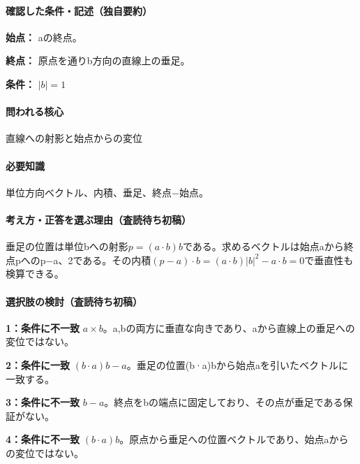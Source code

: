 \paragraph{確認した条件・記述（独自要約）}\mbox{}\par

\noindent\textbf{始点：} aの終点。\par

\noindent\textbf{終点：} 原点を通りb方向の直線上の垂足。\par

\noindent\textbf{条件：} \(|b|=1\)\par

\paragraph{問われる核心} 直線への射影と始点からの変位

\paragraph{必要知識} 単位方向ベクトル、内積、垂足、終点−始点。

\paragraph{考え方・正答を選ぶ理由（査読待ち初稿）} 垂足の位置は単位bへの射影\(p=(a\cdot b)b\)である。求めるベクトルは始点aから終点pへのp−a、2である。その内積\((p-a)\cdot b=(a\cdot b)|b|^2-a\cdot b=0\)で垂直性も検算できる。

\paragraph{選択肢の検討（査読待ち初稿）}\mbox{}\par

\noindent\textbf{1：条件に不一致} \(a\times b\)。a,bの両方に垂直な向きであり、aから直線上の垂足への変位ではない。\par

\noindent\textbf{2：条件に一致} \((b\cdot a)b-a\)。垂足の位置(b·a)bから始点aを引いたベクトルに一致する。\par

\noindent\textbf{3：条件に不一致} \(b-a\)。終点をbの端点に固定しており、その点が垂足である保証がない。\par

\noindent\textbf{4：条件に不一致} \((b\cdot a)b\)。原点から垂足への位置ベクトルであり、始点aからの変位ではない。\par

